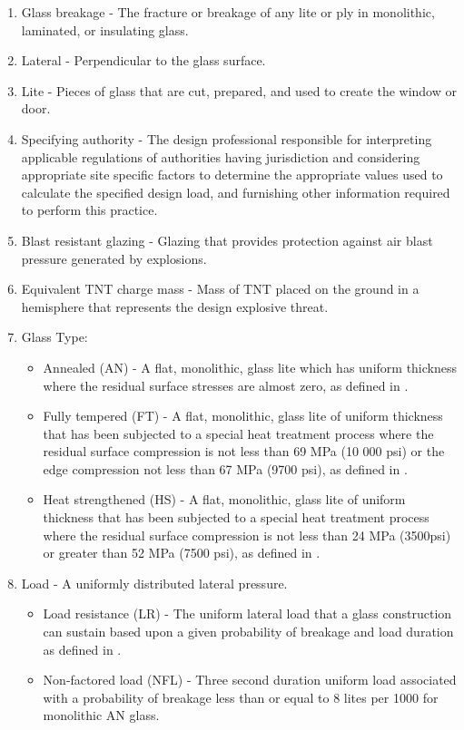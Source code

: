 \documentclass[12pt]{article}
\begin{document}
\begin{enumerate}
\item{Glass breakage - The fracture or breakage of any lite or ply in monolithic, laminated, or insulating glass.}
\item{Lateral - Perpendicular to the glass surface.}
\item{Lite - Pieces of glass that are cut, prepared, and used to create the window or door.}
\item{Specifying authority - The design professional responsible for interpreting applicable regulations of authorities having jurisdiction and considering appropriate site specific factors to determine the appropriate values used to calculate the specified design load, and furnishing other information required to perform this practice.}
\item{Blast resistant glazing - Glazing that provides protection against air blast pressure generated by explosions.}
\item{Equivalent TNT charge mass - Mass of TNT placed on the ground in a hemisphere that represents the design explosive threat.}
\item{Glass Type:}
\begin{itemize}
\item{Annealed (AN) - A flat, monolithic, glass lite which has uniform thickness where the residual surface stresses are almost zero, as defined in \cite{astm2016}.}
\item{Fully tempered (FT) - A flat, monolithic, glass lite of uniform thickness that has been subjected to a special heat treatment process where the residual surface compression is not less than 69 MPa (10 000 psi) or the edge compression not less than 67 MPa (9700 psi), as defined in \cite{astm2012}.}
\item{Heat strengthened (HS) - A flat, monolithic, glass lite of uniform thickness that has been subjected to a special heat treatment process where the residual surface compression is not less than 24 MPa (3500psi) or greater than 52 MPa (7500 psi), as defined in \cite{astm2012}.}
\end{itemize}
\item{Load - A uniformly distributed lateral pressure.}
\begin{itemize}
\item{Load resistance (LR) - The uniform lateral load that a glass construction can sustain based upon a given probability of breakage and load duration as defined in \cite[(pp. 1 and 53)]{astm2009}.}
\item{Non-factored load (NFL) - Three second duration uniform load associated with a probability of breakage less than or equal to 8 lites per 1000 for monolithic AN glass.}

\end{itemize}
\end{enumerate}
\end{document}
